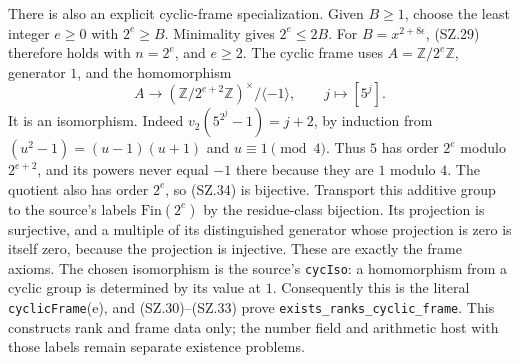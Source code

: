 There is also an explicit cyclic-frame specialization. Given $B\geq1$,
choose the least integer $e\geq0$ with $2^e\geq B$. Minimality
gives $2^e\leq2B$. For $B=x^{2+8\epsilon}$, (SZ.29) therefore
holds with $n=2^e$, and $e\geq2$. The cyclic frame uses
$A=\mathbb Z/2^e\mathbb Z$, generator $1$, and the homomorphism
\[
 A\longrightarrow
  (\mathbb Z/2^{e+2}\mathbb Z)^\times/\langle-1\rangle,
                            \qquad j\longmapsto[5^j].       \tag{SZ.34}
\]
It is an isomorphism. Indeed
$v_2(5^{2^j}-1)=j+2$, by induction from
$(u^2-1)=(u-1)(u+1)$ and $u\equiv1\pmod4$.
Thus $5$ has order $2^e$ modulo $2^{e+2}$, and its powers never
equal $-1$ there because they are $1$ modulo $4$. The quotient
also has order $2^e$, so (SZ.34) is bijective.
Transport this additive group to the source's labels
$\mathrm{Fin}(2^e)$ by the residue-class bijection. Its projection
is surjective, and a multiple of its distinguished generator whose
projection is zero is itself zero, because the projection is
injective. These are exactly the frame axioms.
The chosen isomorphism is the source's \texttt{cycIso}: a homomorphism
from a cyclic group is determined by its value at $1$.
Consequently this is the literal \texttt{cyclicFrame}(e), and
(SZ.30)--(SZ.33) prove \texttt{exists\_ranks\_cyclic\_frame}.
This constructs rank and frame data only; the number field and
arithmetic host with those labels remain separate existence problems.
